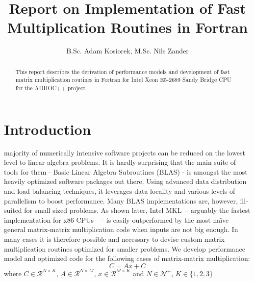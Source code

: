 \documentclass[journal, a4paper]{IEEEtran}
\begin{document}
	\title{Report on Implementation of Fast Multiplication Routines in Fortran}
	\author{B.Sc. Adam Kosiorek, M.Sc. Nils Zander}	
	\maketitle
	


\begin{abstract}
 This report describes the derivation of performance models and development of fast matrix multiplication routines in Fortran for Intel Xeon E5-2689 Sandy Bridge CPU for the ADHOC++ project.
\end{abstract}

\section{Introduction}
     majority of numerically intensive software projects can be reduced on the lowest level to linear algebra problems. It is hardly surprising that the main suite of tools for them - Basic Linear Algebra Subroutines (BLAS) - is amongst the most heavily optimized software packages out there. Using advanced data distribution and load balancing techniques, it leverages data locality and various levels of parallelism to boost performance. Many BLAS implementations are, however, ill-suited for small sized problems. As shown later, Intel MKL~-- arguably the fastest implementation for x86 CPUs~\cite{MKL}~-- is easily outperformed by the most na\"ive general matrix-matrix multiplication code when inputs are not big enough. In many cases it is therefore possible and necessary to devise custom matrix multiplication routines optimized for smaller problems. We develop performance model and optimized code for the following cases of matrix-matrix multiplication:
    \begin{equation}
     C = Ax + C
    \end{equation}
    where $C \in \mathcal{R}^{N \times K}$, $A \in \mathcal{R}^{N \times M}$, $x \in \mathcal{R}^{M \times K}$ and $N \in \mathcal{N}^+$, $K \in \{1, 2, 3\}$
\end{document}

